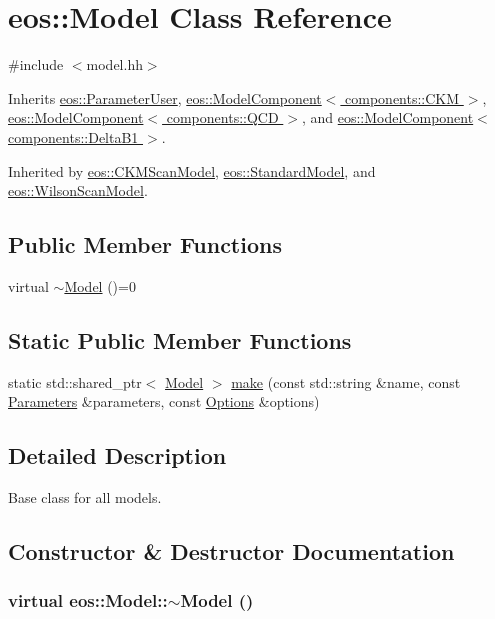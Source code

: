 \hypertarget{classeos_1_1Model}{
\section{eos::Model Class Reference}
\label{classeos_1_1Model}
}


{\ttfamily \#include $<$model.hh$>$}

Inherits \hyperlink{classeos_1_1ParameterUser}{eos::ParameterUser}, \hyperlink{classeos_1_1ModelComponent_3_01components_1_1CKM_01_4}{eos::ModelComponent$<$ components::CKM $>$}, \hyperlink{classeos_1_1ModelComponent_3_01components_1_1QCD_01_4}{eos::ModelComponent$<$ components::QCD $>$}, and \hyperlink{classeos_1_1ModelComponent_3_01components_1_1DeltaB1_01_4}{eos::ModelComponent$<$ components::DeltaB1 $>$}.

Inherited by \hyperlink{classeos_1_1CKMScanModel}{eos::CKMScanModel}, \hyperlink{classeos_1_1StandardModel}{eos::StandardModel}, and \hyperlink{classeos_1_1WilsonScanModel}{eos::WilsonScanModel}.\subsection*{Public Member Functions}
\begin{DoxyCompactItemize}
\item 
virtual \hyperlink{classeos_1_1Model_a17c7c1491d3d0761bfb663f231181a21}{$\sim$Model} ()=0
\end{DoxyCompactItemize}
\subsection*{Static Public Member Functions}
\begin{DoxyCompactItemize}
\item 
static std::shared\_\-ptr$<$ \hyperlink{classeos_1_1Model}{Model} $>$ \hyperlink{classeos_1_1Model_aaaf8ba614a0212952f6f9485034c3436}{make} (const std::string \&name, const \hyperlink{classeos_1_1Parameters}{Parameters} \&parameters, const \hyperlink{classeos_1_1Options}{Options} \&options)
\end{DoxyCompactItemize}


\subsection{Detailed Description}
Base class for all models. 

\subsection{Constructor \& Destructor Documentation}
\hypertarget{classeos_1_1Model_a17c7c1491d3d0761bfb663f231181a21}{
\subsubsection[{$\sim$Model}]{\setlength{\rightskip}{0pt plus 5cm}virtual eos::Model::$\sim$Model ()}}
\label{classeos_1_1Model_a17c7c1491d3d0761bfb663f231181a21}


